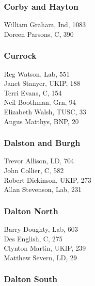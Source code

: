 \documentclass[a4paper,openany,10pt]{book}
\begin{document}
\subsubsection*{Corby and Hayton}



William Graham, Ind, 1083\\
Doreen Parsons, C, 390\\


\subsubsection*{Currock}



Reg Watson, Lab, 551\\
Janet Stanyer, UKIP, 188\\
Terri Evans, C, 154\\
Neil Boothman, Grn, 94\\
Elizabeth Walsh, TUSC, 33\\
Angus Matthys, BNP, 20\\


\subsubsection*{Dalston and Burgh}



Trevor Allison, LD, 704\\
John Collier, C, 582\\
Robert Dickinson, UKIP, 273\\
Allan Stevenson, Lab, 231\\


\subsubsection*{Dalton North}



Barry Doughty, Lab, 603\\
Des English, C, 275\\
Clynton Martin, UKIP, 239\\
Matthew Severn, LD, 29\\


\subsubsection*{Dalton South}
\end{document}
